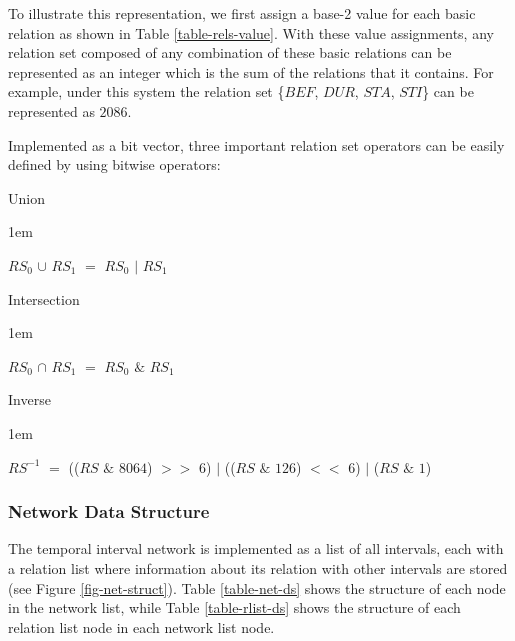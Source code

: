 \documentclass[11pt]{report}
\newenvironment{vquote}
{
  \begin{list}{}{\leftmargin 1em}\item[]
}
{
  \end{list}
}
\begin{document}
          To illustrate this representation, we first assign a base-2 value
          for each basic relation as shown in Table \ref{table-rels-value}.
          With these value assignments, any relation set composed of any
          combination of these basic relations can be represented as an integer
          which is the sum of the relations that it contains. For example,
          under this system the relation set \{$BEF$, $DUR$, $STA$, $STI$\} can
          be represented as $2086$.

          Implemented as a bit vector, three important relation set operators
          can be easily defined by using bitwise operators:

          \begin{itemize}
            \item
              Union
              \begin{vquote}
                $RS_0$ $\cup$ $RS_1$ $=$ $RS_0$ $|$ $RS_1$
              \end{vquote}
  
            \item
              Intersection
              \begin{vquote}
                $RS_0$ $\cap$ $RS_1$ $=$ $RS_0$ $\&$ $RS_1$
              \end{vquote}

            \item
              Inverse

              \begin{vquote}
                $RS^{-1}$ $=$
                  (($RS$ $\&$ $8064$) $>>$ $6$) $|$
                  (($RS$ $\&$ $126$)  $<<$ $6$) $|$
                  ($RS$ $\&$ $1$)
              \end{vquote}
          \end{itemize}

        \subsubsection{Network Data Structure}

          The temporal interval network is implemented as a list of all
          intervals, each with a relation list where information about its
          relation with other intervals are stored (see Figure
          \ref{fig-net-struct}). Table \ref{table-net-ds} shows the structure
          of each node in the network list, while Table
          \ref{table-rlist-ds} shows the structure of each relation list
          node in each network list node.
\end{document}
